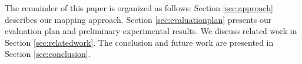 
%



	

The remainder of this paper is organized as follows: Section \ref{sec:approach} describes our mapping approach. 
Section \ref{sec:evaluationplan} presents our evaluation plan and preliminary experimental results. 
We discuss related work in Section \ref{sec:relatedwork}. 
The conclusion and future work are presented in Section \ref{sec:conclusion}.

